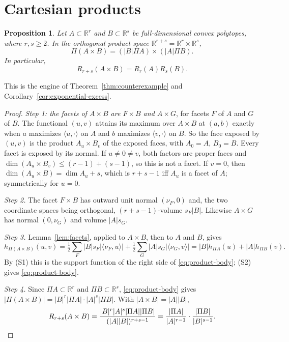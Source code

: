 \documentclass[11pt]{article}
\newtheorem{proposition}[theorem]{Proposition}
\newcommand{\R}{\mathbb R}
\begin{document}
\section{Cartesian products}

\begin{proposition}\label{prop:product}
Let \(A\subset\R^r\) and \(B\subset\R^s\) be full-dimensional convex
polytopes, where \(r,s\ge2\). In the orthogonal product space
\(\R^{r+s}=\R^r\times\R^s\),
\begin{equation}\label{eq:product-body}
 \Pi(A\times B)=(|B|\Pi A)\times(|A|\Pi B).
\end{equation}
In particular,
\begin{equation}\label{eq:multiplicative}
 R_{r+s}(A\times B)=R_r(A)R_s(B).
\end{equation}
\end{proposition}

This is the engine of Theorem~\ref{thm:counterexample} and Corollary~\ref{cor:exponential-excess}.

\begin{proof}
\emph{Step 1: the facets of \(A\times B\) are \(F\times B\) and \(A\times G\)}, for facets \(F\) of \(A\) and \(G\) of \(B\). The functional \((u,v)\) attains its maximum over \(A\times B\) at \((a,b)\) exactly when \(a\) maximizes \(\langle u,\cdot\rangle\) on \(A\) and \(b\) maximizes \(\langle v,\cdot\rangle\) on \(B\). So the face exposed by \((u,v)\) is the product \(A_u\times B_v\) of the exposed faces, with \(A_0=A\), \(B_0=B\). Every facet is exposed by its normal. If \(u\ne0\ne v\), both factors are proper faces and \(\dim(A_u\times B_v)\le(r-1)+(s-1)\), so this is not a facet. If \(v=0\), then \(\dim(A_u\times B)=\dim A_u+s\), which is \(r+s-1\) iff \(A_u\) is a facet of \(A\); symmetrically for \(u=0\).

\emph{Step 2.} The facet \(F\times B\) has outward unit normal \((\nu_F,0)\) and, the two coordinate spaces being orthogonal, \((r+s-1)\)-volume \(s_F|B|\). Likewise \(A\times G\) has normal \((0,\nu_G)\) and volume \(|A|s_G\).

\emph{Step 3.} Lemma~\ref{lem:facets}, applied to \(A\times B\), then to \(A\) and \(B\), gives
\[
 h_{\Pi(A\times B)}(u,v)
 =\tfrac12\sum_F|B|s_F|\langle\nu_F,u\rangle|+\tfrac12\sum_G|A|s_G|\langle\nu_G,v\rangle|
 =|B|h_{\Pi A}(u)+|A|h_{\Pi B}(v).
\]
By (S1) this is the support function of the right side of \eqref{eq:product-body}; (S2) gives \eqref{eq:product-body}.

\emph{Step 4.} Since \(\Pi A\subset\R^r\) and \(\Pi B\subset\R^s\), \eqref{eq:product-body} gives \(|\Pi(A\times B)|=|B|^r|\Pi A|\cdot|A|^s|\Pi B|\). With \(|A\times B|=|A||B|\),
\[
 R_{r+s}(A\times B)
 =\frac{|B|^r|A|^s|\Pi A||\Pi B|}{(|A||B|)^{r+s-1}}
 =\frac{|\Pi A|}{|A|^{r-1}}\cdot\frac{|\Pi B|}{|B|^{s-1}}.\qedhere
\]
\end{proof}
\end{document}

